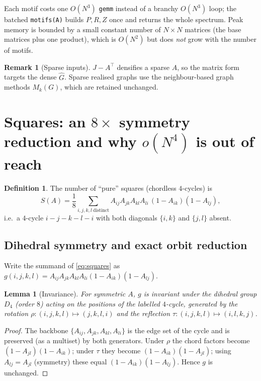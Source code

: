 \documentclass[11pt]{article}
\theoremstyle{plain}
\newtheorem{lemma}{Lemma}
\theoremstyle{definition}
\newtheorem{definition}{Definition}
\newtheorem{remark}{Remark}
\newcommand{\Ghat}{\hat{G}}
\begin{document}
Each motif costs one $O(N^3)$ \texttt{gemm} instead of a branchy $O(N^3)$ loop; the batched \texttt{motifs(A)}
builds $P,R,Z$ once and returns the whole spectrum. Peak memory is bounded by a small constant number of
$N\times N$ matrices (the base matrices plus one product), which is $O(N^2)$ but does \emph{not} grow with
the number of motifs.

\begin{remark}[Sparse inputs]
$J-A^\top$ densifies a sparse $A$, so the matrix form targets the dense $\Ghat$. Sparse realised graphs use
the neighbour-based graph methods $M_k(G)$, which are retained unchanged.
\end{remark}

\section{Squares: an $8\times$ symmetry reduction and why $o(N^4)$ is out of reach}
\label{sec:squares}

\begin{definition}
The number of ``pure'' squares (chordless $4$-cycles) is
\begin{equation}\label{eq:squares}
S(A)=\frac18\sum_{i,j,k,l\ \text{distinct}} A_{ij}A_{jk}A_{kl}A_{li}\,(1-A_{ik})(1-A_{lj}),
\end{equation}
i.e.\ a $4$-cycle $i\!-\!j\!-\!k\!-\!l\!-\!i$ with both diagonals $\{i,k\}$ and $\{j,l\}$ absent.
\end{definition}

\subsection{Dihedral symmetry and exact orbit reduction}

Write the summand of \eqref{eq:squares} as $g(i,j,k,l)=A_{ij}A_{jk}A_{kl}A_{li}(1-A_{ik})(1-A_{lj})$.

\begin{lemma}[Invariance]\label{lem:dihedral}
For symmetric $A$, $g$ is invariant under the dihedral group $D_4$ (order $8$) acting on the positions of the
labelled $4$-cycle, generated by the rotation $\rho:(i,j,k,l)\mapsto(j,k,l,i)$ and the reflection
$\tau:(i,j,k,l)\mapsto(i,l,k,j)$.
\end{lemma}
\begin{proof}
The backbone $\{A_{ij},A_{jk},A_{kl},A_{li}\}$ is the edge set of the cycle and is preserved (as a multiset)
by both generators. Under $\rho$ the chord factors become $(1-A_{jl})(1-A_{ik})$; under $\tau$ they become
$(1-A_{ik})(1-A_{jl})$; using $A_{lj}=A_{jl}$ (symmetry) these equal $(1-A_{ik})(1-A_{lj})$. Hence $g$ is
unchanged.
\end{proof}
\end{document}
